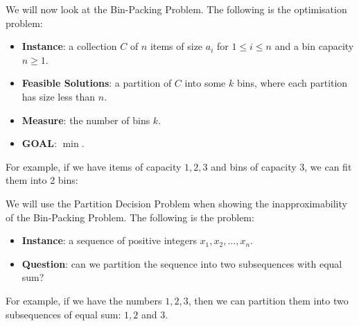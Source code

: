 \documentclass[a4paper, openany]{memoir}
\begin{document}
    We will now look at the Bin-Packing Problem. The following is the optimisation problem:
    \begin{itemize}
        \item \textbf{Instance}: a collection $C$ of $n$ items of size $a_i$ for $1 \leq i \leq n$ and a bin capacity $n \geq 1$.
        \item \textbf{Feasible Solutions}: a partition of $C$ into some $k$ bins, where each partition has size less than $n$.
        \item \textbf{Measure}: the number of bins $k$.
        \item \textbf{GOAL}: $\min$.
    \end{itemize}
    For example, if we have items of capacity $1, 2, 3$ and bins of capacity $3$, we can fit them into 2 bins:
    \begin{figure}[H]
        \centering
    \end{figure}

    We will use the Partition Decision Problem when showing the inapproximability of the Bin-Packing Problem. The following is the problem:
    \begin{itemize}
        \item \textbf{Instance}: a sequence of positive integers $x_1, x_2, \dots, x_n$.
        \item \textbf{Question}: can we partition the sequence into two subsequences with equal sum?
    \end{itemize}
    For example, if we have the numbers $1, 2, 3$, then we can partition them into two subsequences of equal sum: $1, 2$ and $3$.
\end{document}
